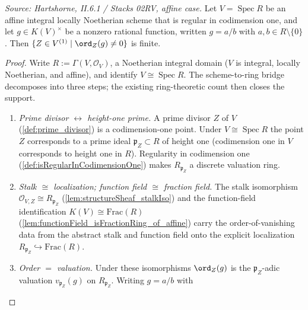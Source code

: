 \begin{lemma}
  \label{lem:finite_order_support_affine}
  \textit{Source: Hartshorne, II.6.1 / Stacks 02RV, affine case.}
  Let \(V = \operatorname{Spec} R\) be an affine integral locally Noetherian
  scheme that is regular in codimension one, and let \(g \in K(V)^{\times}\) be a
  nonzero rational function, written \(g = a/b\) with \(a, b \in R \setminus \{0\}\).
  Then \(\{Z \in V^{(1)} \mid \ord_Z(g) \ne 0\}\) is finite.
\end{lemma}
\begin{proof}
  Write \(R := \Gamma(V, \mathcal O_V)\), a Noetherian integral domain (\(V\) is
  integral, locally Noetherian, and affine), and identify
  \(V \cong \operatorname{Spec} R\). The scheme-to-ring bridge decomposes into
  three steps; the existing ring-theoretic count then closes the support.
  \begin{enumerate}
  \item[(i)] \emph{Prime divisor \(\leftrightarrow\) height-one prime.} A prime
    divisor \(Z\) of \(V\) (\ref{def:prime_divisor}) is a codimension-one point.
    Under \(V \cong \operatorname{Spec} R\) the point \(Z\) corresponds to a
    prime ideal \(\mathfrak p_Z \subset R\) of height one (codimension one in
    \(V\) corresponds to height one in \(R\)). Regularity in codimension one
    (\ref{def:isRegularInCodimensionOne}) makes \(R_{\mathfrak p_Z}\) a
    discrete valuation ring.
  \item[(ii)] \emph{Stalk \(\cong\) localization; function field \(\cong\)
    fraction field.} The stalk isomorphism
    \(\mathcal O_{V, Z} \cong R_{\mathfrak p_Z}\)
    (\ref{lem:structureSheaf_stalkIso}) and the function-field identification
    \(K(V) \cong \mathrm{Frac}(R)\)
    (\ref{lem:functionField_isFractionRing_of_affine}) carry the
    order-of-vanishing data from the abstract stalk and function field onto the
    explicit localization \(R_{\mathfrak p_Z} \hookrightarrow \mathrm{Frac}(R)\).
  \item[(iii)] \emph{Order \(=\) valuation.} Under these isomorphisms
    \(\ord_Z(g)\) is the \(\mathfrak p_Z\)-adic valuation
    \(v_{\mathfrak p_Z}(g)\) on \(R_{\mathfrak p_Z}\). Writing \(g = a/b\) with

\end{enumerate}
\end{proof}
